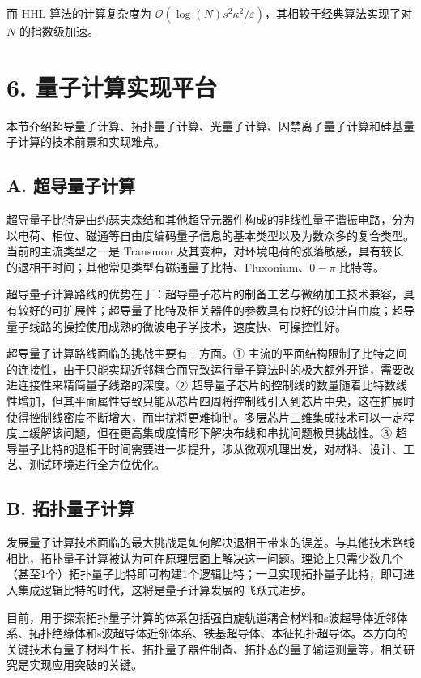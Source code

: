 \documentclass[aps,prl,twocolumn,groupedaddress]{revtex4-2}
\begin{document}
而 HHL 算法的计算复杂度为 $\mathcal{O}(\log(N)s^2\kappa^2/\varepsilon)$，其相较于经典算法实现了对 $N$ 的指数级加速。

\section{6. 量子计算实现平台}

本节介绍超导量子计算、拓扑量子计算、光量子计算、囚禁离子量子计算和硅基量子计算的技术前景和实现难点。

\subsection{A. 超导量子计算}

超导量子比特是由约瑟夫森结和其他超导元器件构成的非线性量子谐振电路，分为以电荷、相位、磁通等自由度编码量子信息的基本类型以及为数众多的复合类型。当前的主流类型之一是 Transmon 及其变种，对环境电荷的涨落敏感，具有较长的退相干时间；其他常见类型有磁通量子比特、Fluxonium、$0-\pi$ 比特等。

超导量子计算路线的优势在于：超导量子芯片的制备工艺与微纳加工技术兼容，具有较好的可扩展性；超导量子比特及相关器件的参数具有良好的设计自由度；超导量子线路的操控使用成熟的微波电子学技术，速度快、可操控性好。

超导量子计算路线面临的挑战主要有三方面。① 主流的平面结构限制了比特之间的连接性，由于只能实现近邻耦合而导致运行量子算法时的极大额外开销，需要改进连接性来精简量子线路的深度。② 超导量子芯片的控制线的数量随着比特数线性增加，但其平面属性导致只能从芯片四周将控制线引入到芯片中央，这在扩展时使得控制线密度不断增大，而串扰将更难抑制。多层芯片三维集成技术可以一定程度上缓解该问题，但在更高集成度情形下解决布线和串扰问题极具挑战性。③ 超导量子比特的退相干时间需要进一步提升，涉从微观机理出发，对材料、设计、工艺、测试环境进行全方位优化。

\subsection{B. 拓扑量子计算}

发展量子计算技术面临的最大挑战是如何解决退相干带来的误差。与其他技术路线相比，拓扑量子计算被认为可在原理层面上解决这一问题。理论上只需少数几个（甚至1个）拓扑量子比特即可构建1个逻辑比特；一旦实现拓扑量子比特，即可进入集成逻辑比特的时代，这将是量子计算发展的飞跃式进步。

目前，用于探索拓扑量子计算的体系包括强自旋轨道耦合材料和s波超导体近邻体系、拓扑绝缘体和s波超导体近邻体系、铁基超导体、本征拓扑超导体。本方向的关键技术有量子材料生长、拓扑量子器件制备、拓扑态的量子输运测量等，相关研究是实现应用突破的关键。
\end{document}
